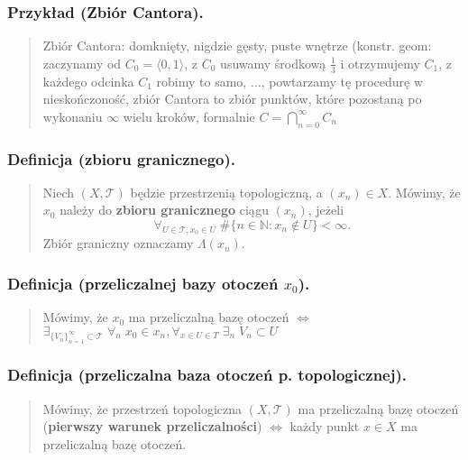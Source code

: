 \documentclass[10pt,a4paper]{article}
\begin{document}
{    \subsubsection*{Przykład (Zbiór Cantora).}
    \begin{quote}
    Zbiór Cantora: domknięty, nigdzie gęsty, puste wnętrze (konstr. geom: zaczynamy od $C_0 = \langle 0, 1 \rangle$, z $C_0$ usuwamy środkową $\frac{1}{3}$ i otrzymujemy $C_1$, z każdego odcinka $C_1$ robimy to samo, $\dots$, powtarzamy tę procedurę w nieskończoność, zbiór Cantora to zbiór punktów, które pozostaną po wykonaniu $\infty$ wielu kroków, formalnie $C = \bigcap_{n=0}^{\infty} C_n$
    \end{quote}

    \subsubsection*{Definicja (zbioru granicznego).}
    \begin{quote}
    Niech $(X, \mathcal{T})$ będzie przestrzenią topologiczną, a $(x_n) \in X$. Mówimy, że $x_0$ należy do \textbf{zbioru granicznego} ciągu $(x_n)$, jeżeli \\
    $$\forall_{U \in \mathcal{T}, x_0 \in U} \; \#\{n \in \mathbb{N}: x_n \notin U\} < \infty.$$
    Zbiór graniczny oznaczamy $\Lambda(x_n)$.
    \end{quote}

    \subsubsection*{Definicja (przeliczalnej bazy otoczeń $x_0$).}
    \begin{quote}
    Mówimy, że $x_0$ ma przeliczalną bazę otoczeń $\iff$ $\exists_{\{V_n\}_{n=1}^{\infty} \subset \mathcal{T}} \; \forall_{n} \; x_0 \in x_n, \forall_{x \in U \in T} \; \exists_n \; V_n \subset U$
    \end{quote}

    \subsubsection*{Definicja (przeliczalna baza otoczeń p. topologicznej).}
    \begin{quote}
    Mówimy, że przestrzeń topologiczna $(X, \mathcal{T})$ ma przeliczalną bazę otoczeń (\textbf{pierwszy warunek przeliczalności}) $\iff$ każdy punkt $x \in X$ ma przeliczalną bazę otoczeń.
    \end{quote}

}
\end{document}
